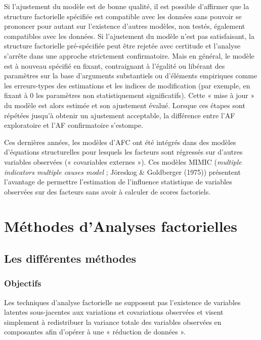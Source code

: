 \documentclass[12pt,a4paper]{reedthesis}
\begin{document}
Si l'ajustement du modèle est de bonne qualité, il est possible d'affirmer que la structure factorielle spécifiée est compatible avec les données sans pouvoir se prononcer pour autant sur l'existence d'autres modèles, non testés, également compatibles avec les données. Si l'ajustement du modèle n'est pas satisfaisant, la structure factorielle pré-spécifiée peut être rejetée avec certitude et l'analyse s'arrête dans une approche strictement confirmatoire. Mais en général, le modèle est à nouveau spécifié en fixant, contraignant à l'égalité ou libérant des paramètres sur la base d'arguments substantiels ou d'éléments empiriques comme les erreurs-types des estimations et les indices de modification (par exemple, en fixant à 0 les paramètres non statistiquement significatifs). Cette « mise à jour » du modèle est alors estimée et son ajustement évalué. Lorsque ces étapes sont répétées jusqu'à obtenir un ajustement acceptable, la différence entre l'AF exploratoire et l'AF confirmatoire s'estompe.

Ces dernières années, les modèles d'AFC ont été intégrés dans des modèles d'équations structurelles pour lesquels les facteurs sont régressés sur d'autres variables observées (« covariables externes »). Ces modèles MIMIC (\emph{multiple indicators multiple causes model} ; Jöreskog \& Goldberger (1975)) présentent l'avantage de permettre l'estimation de l'influence statistique de variables observées sur des facteurs sans avoir à calculer de scores factoriels.

\hypertarget{sec:annexeAFACM}{%
\section{Méthodes d'Analyses factorielles}\label{sec:annexeAFACM}}

\hypertarget{sec:annexeAFACMdescri}{%
\subsection{Les différentes méthodes}\label{sec:annexeAFACMdescri}}

\hypertarget{objectifs}{%
\subsubsection{Objectifs}\label{objectifs}}

Les techniques d'analyse factorielle ne supposent pas l'existence de variables latentes sous-jacentes aux variations et covariations observées et visent simplement à redistribuer la variance totale des variables observées en composantes afin d'opérer à une « réduction de données ».
\end{document}
